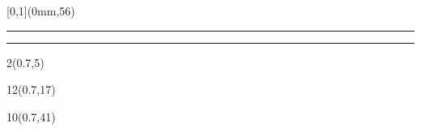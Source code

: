 \begin{frame}[plain]
	\begin{textblock*}{\paperwidth}[0,1](0mm,56\TPVertModule)
		\textcolor{rouge}{\rule{\banderougewidth}{\banderougeheight}}%
		\textcolor{bleu}{\rule{\bandeorwidth}{\bandeorheight}}
	\end{textblock*}
	
	\begin{textblock*}{2\TPHorizModule}(0.7\TPHorizModule,5\TPVertModule)
		\textcolor[rgb]{0.13,0.13,0.13}{\webinaire}
	\end{textblock*}
	
	\begin{textblock*}{12\TPHorizModule}(0.7\TPHorizModule,17\TPVertModule)
		\textcolor[rgb]{0.13,0.13,0.13}{\titlefmt}
	\end{textblock*}
	
	\begin{textblock*}{10\TPHorizModule}(0.7\TPHorizModule,41\TPVertModule)
		\textcolor[rgb]{0.13,0.13,0.13}{\datefmt}
	\end{textblock*}
\end{frame}
\endgroup
